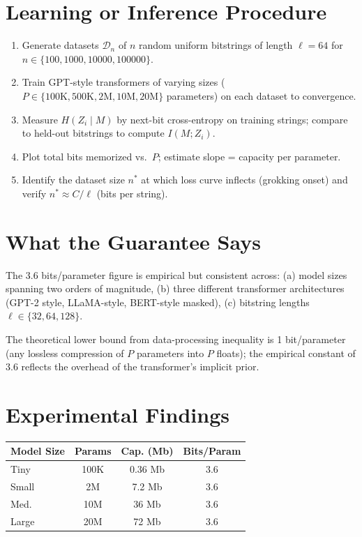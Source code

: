 \documentclass[10pt,twocolumn]{article}
\begin{document}
\section{Learning or Inference Procedure}

\begin{enumerate}[itemsep=2pt,parsep=0pt]
  \item Generate datasets $\mathcal{D}_n$ of $n$ random uniform bitstrings
    of length $\ell = 64$ for $n \in \{100, 1000, 10000, 100000\}$.
  \item Train GPT-style transformers of varying sizes ($P \in \{100\text{K},
    500\text{K}, 2\text{M}, 10\text{M}, 20\text{M}\}$ parameters) on
    each dataset to convergence.
  \item Measure $H(Z_i \mid M)$ by next-bit cross-entropy on training
    strings; compare to held-out bitstrings to compute $I(M; Z_i)$.
  \item Plot total bits memorized vs.\ $P$; estimate slope = capacity per parameter.
  \item Identify the dataset size $n^\ast$ at which loss curve inflects
    (grokking onset) and verify $n^\ast \approx C / \ell$ (bits per string).
\end{enumerate}

\section{What the Guarantee Says}

The 3.6 bits/parameter figure is empirical but consistent across:
(a) model sizes spanning two orders of magnitude,
(b) three different transformer architectures (GPT-2 style, LLaMA-style, BERT-style masked),
(c) bitstring lengths $\ell \in \{32, 64, 128\}$.

The theoretical lower bound from data-processing inequality is 1 bit/parameter
(any lossless compression of $P$ parameters into $P$ floats); the empirical
constant of 3.6 reflects the overhead of the transformer's implicit prior.

\section{Experimental Findings}

\begin{center}
\small
\begin{tabular}{lccc}
\toprule
\textbf{Model Size} & \textbf{Params} & \textbf{Cap. (Mb)} & \textbf{Bits/Param} \\
\midrule
Tiny  & 100K  & 0.36 Mb & 3.6 \\
Small & 2M    & 7.2 Mb  & 3.6 \\
Med.  & 10M   & 36 Mb   & 3.6 \\
Large & 20M   & 72 Mb   & 3.6 \\
\bottomrule
\end{tabular}
\end{center}
\end{document}
